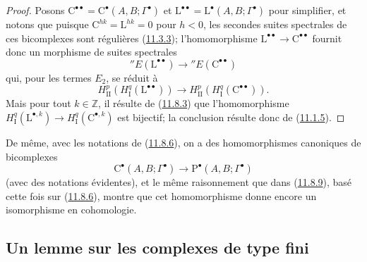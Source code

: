 \begin{proof}
Posons $\mathrm C^{\bullet\bullet}=
\mathrm C^\bullet(A,B;\Gamma^\bullet)$ et
$\mathrm L^{\bullet\bullet}=
\mathrm L^\bullet(A,B;\Gamma^\bullet)$ pour simplifier, et notons que
puisque $\mathrm C^{hk}=\mathrm L^{hk}=0$ pour $h<0$, les secondes suites
spectrales de ces bicomplexes sont régulières
(\hyperref[0.11.3.3-fr]{11.3.3}); l'homomorphisme
$\mathrm L^{\bullet\bullet}\to\mathrm C^{\bullet\bullet}$ fournit donc un
morphisme de suites spectrales
\[
{}''E(\mathrm L^{\bullet\bullet})\longrightarrow
{}''E(\mathrm C^{\bullet\bullet})
\]
qui, pour les termes $E_2$, se réduit à
\[
\label{0.11.8.9.1-fr}
\tag{11.8.9.1}
H^p_{\mathrm{II}}(H^q_{\mathrm I}(\mathrm L^{\bullet\bullet}))
\longrightarrow
H^p_{\mathrm{II}}(H^q_{\mathrm I}(\mathrm C^{\bullet\bullet})).
\]
Mais pour tout $k\in\mathbb Z$, il résulte de
(\hyperref[0.11.8.3-fr]{11.8.3}) que l'homomorphisme
$H^q_{\mathrm I}(\mathrm L^{\bullet,k})\to
H^q_{\mathrm I}(\mathrm C^{\bullet,k})$ est bijectif; la conclusion résulte
donc de (\hyperref[0.11.1.5-fr]{11.1.5}).
\end{proof}

\begin{env}[11.8.10]
\label{0.11.8.10-fr}
De même, avec les notations de (\hyperref[0.11.8.6-fr]{11.8.6}), on a des
homomorphismes canoniques de bicomplexes
\[
\mathrm C^\bullet(A,B;\Gamma^\bullet)\longrightarrow
\mathrm P^\bullet(A,B;\Gamma^\bullet)
\]
(avec des notations évidentes), et le même raisonnement que dans
(\hyperref[0.11.8.9-fr]{11.8.9}), basé cette fois sur
(\hyperref[0.11.8.6-fr]{11.8.6}), montre que cet homomorphisme donne encore
un isomorphisme en cohomologie.
\end{env}

\subsection{Un lemme sur les complexes de type fini}
\label{subsection:0.11.9-fr}


